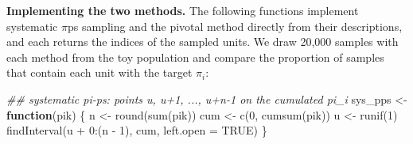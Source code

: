 \documentclass[
  letterpaper,
  DIV=11,
  numbers=noendperiod]{scrreprt}
\newenvironment{Shaded}{\begin{snugshade}}{\end{snugshade}}
\newcommand{\AttributeTok}[1]{\textcolor[rgb]{0.40,0.45,0.13}{#1}}
\newcommand{\ConstantTok}[1]{\textcolor[rgb]{0.56,0.35,0.01}{#1}}
\newcommand{\ControlFlowTok}[1]{\textcolor[rgb]{0.00,0.23,0.31}{\textbf{#1}}}
\newcommand{\DecValTok}[1]{\textcolor[rgb]{0.68,0.00,0.00}{#1}}
\newcommand{\DocumentationTok}[1]{\textcolor[rgb]{0.37,0.37,0.37}{\textit{#1}}}
\newcommand{\FunctionTok}[1]{\textcolor[rgb]{0.28,0.35,0.67}{#1}}
\newcommand{\NormalTok}[1]{\textcolor[rgb]{0.00,0.23,0.31}{#1}}
\newcommand{\OtherTok}[1]{\textcolor[rgb]{0.00,0.23,0.31}{#1}}
\newcommand{\SpecialCharTok}[1]{\textcolor[rgb]{0.37,0.37,0.37}{#1}}
\renewcommand{\[}{\begin{equation}}
\renewcommand{\]}{\end{equation}}
\begin{document}
\textbf{Implementing the two methods.} The following functions implement
systematic \(\pi\)ps sampling and the pivotal method directly from their
descriptions, and each returns the indices of the sampled units. We draw
20,000 samples with each method from the toy population and compare the
proportion of samples that contain each unit with the target \(\pi_i\):

\begin{Shaded}
\begin{Highlighting}[]
\DocumentationTok{\#\# systematic pi{-}ps: points u, u+1, ..., u+n{-}1 on the cumulated pi\_i}
\NormalTok{sys\_pps }\OtherTok{\textless{}{-}} \ControlFlowTok{function}\NormalTok{(pik) \{}
\NormalTok{  n }\OtherTok{\textless{}{-}} \FunctionTok{round}\NormalTok{(}\FunctionTok{sum}\NormalTok{(pik))}
\NormalTok{  cum }\OtherTok{\textless{}{-}} \FunctionTok{c}\NormalTok{(}\DecValTok{0}\NormalTok{, }\FunctionTok{cumsum}\NormalTok{(pik))}
\NormalTok{  u }\OtherTok{\textless{}{-}} \FunctionTok{runif}\NormalTok{(}\DecValTok{1}\NormalTok{)}
  \FunctionTok{findInterval}\NormalTok{(u }\SpecialCharTok{+} \DecValTok{0}\SpecialCharTok{:}\NormalTok{(n }\SpecialCharTok{{-}} \DecValTok{1}\NormalTok{), cum, }\AttributeTok{left.open =} \ConstantTok{TRUE}\NormalTok{)}
\NormalTok{\}}


\end{Highlighting}
\end{Shaded}
\end{document}
